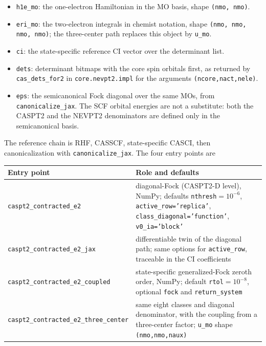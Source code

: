 \begin{itemize}
\item \texttt{h1e\_mo}: the one-electron Hamiltonian in the MO basis,
  shape \texttt{(nmo, nmo)}.
\item \texttt{eri\_mo}: the two-electron integrals in chemist notation,
  shape \texttt{(nmo, nmo, nmo, nmo)}; the three-center path replaces
  this object by \texttt{u\_mo}.
\item \texttt{ci}: the state-specific reference CI vector over the
  determinant list.
\item \texttt{dets}: determinant bitmaps with the core spin orbitals
  first, as returned by \texttt{cas\_dets\_for2} in
  \texttt{core.nevpt2.impl} for the arguments \texttt{(ncore,nact,nele)}.
\item \texttt{eps}: the semicanonical Fock diagonal over the same MOs,
  from \texttt{canonicalize\_jax}.  The SCF orbital energies are not a
  substitute: both the CASPT2 and the NEVPT2 denominators are defined
  only in the semicanonical basis.
\end{itemize}

The reference chain is RHF, CASSCF, state-specific CASCI, then
canonicalization with \texttt{canonicalize\_jax}.  The four entry
points are

\begin{center}
\small
\begin{tabularx}{\textwidth}{>{\raggedright\arraybackslash}p{}X}
\toprule
Entry point & Role and defaults \\
\midrule
\texttt{caspt2\_contracted\_e2} &
  diagonal-Fock (CASPT2-D level), NumPy; defaults
  \texttt{nthresh}$=10^{-6}$, \texttt{active\_row='replica'},
  \texttt{class\_diagonal='function'}, \texttt{v0\_ia='block'} \\
\texttt{caspt2\_contracted\_e2\_jax} &
  differentiable twin of the diagonal path; same options for
  \texttt{active\_row}, traceable in the CI coefficients \\
\texttt{caspt2\_contracted\_e2\_coupled} &
  state-specific generalized-Fock zeroth order, NumPy; default
  \texttt{rtol}$=10^{-8}$, optional \texttt{fock} and
  \texttt{return\_system} \\
\texttt{caspt2\_contracted\_e2\_three\_center} &
  same eight classes and diagonal denominator, with the coupling from
  a three-center factor; \texttt{u\_mo} shape
  \texttt{(nmo,nmo,naux)} \\
\bottomrule
\end{tabularx}
\end{center}

